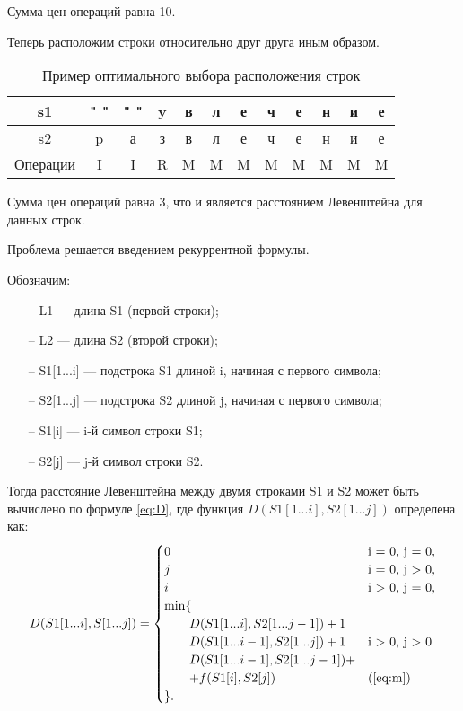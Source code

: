 Сумма цен операций равна 10.

Теперь расположим строки относительно друг друга иным образом.
\begin{table}[h]
	\begin{center}
		\caption{\label{tabular:ex2} Пример оптимального выбора расположения строк}
			\begin{tabular}{c|c|c|c|c|c|c|c|c|c|c|c}
				s1 & " " & " " & y & в & л & е & ч & е & н & и & е \\
				\hline
				s2 & p & а & з & в & л & е & ч & е & н & и & е \\
				\hline
				Операции & I & I & R & M & M & M & M & M & M & M & M
			\end{tabular}
	\end{center}
\end{table}

Сумма цен операций равна 3, что и является расстоянием Левенштейна для данных строк.

Проблема решается введением рекуррентной формулы.

Обозначим:
\begin{itemize}
	\item[--] L1 — длина S1 (первой строки);
	\item[--] L2 — длина S2 (второй строки);
	\item[--] S1[1...i] — подстрока S1 длиной i, начиная с первого символа;
	\item[--] S2[1...j] — подстрока S2 длиной j, начиная с первого символа;
	\item[--] S1[i] — i-й символ строки S1;
	\item[--] S2[j] — j-й символ строки S2.
\end{itemize}

Тогда расстояние Левенштейна между двумя строками S1 и S2 может быть вычислено по формуле \ref{eq:D}, где функция $D(S1[1...i], S2[1...j])$ определена как:
\begin{equation}
	\label{eq:D}
	D(S1[1...i], S[1...j]) = \begin{cases}
		0 &\text{i = 0, j = 0},\\
		j &\text{i = 0, j > 0},\\
		i &\text{i > 0, j = 0},\\
		\min \lbrace \\
			\qquad D(S1[1...i], S2[1...j-1]) + 1\\
			\qquad D(S1[1...i-1], S2[1...j]) + 1 &\text{i > 0, j > 0}\\
			\qquad D(S1[1...i-1], S2[1...j-1]) + \\
			\qquad + f(S1[i], S2[j]) &\text(\ref{eq:m})\\
		\rbrace.
	\end{cases}
\end{equation}

